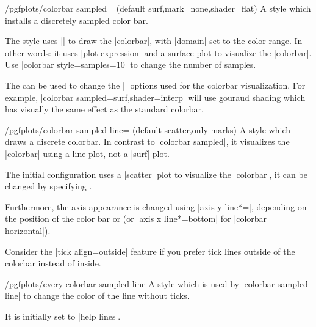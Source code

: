 \begin{stylekey}{/pgfplots/colorbar sampled= (default surf,mark=none,shader=flat)}
	A style which installs a discretely sampled color bar.
\begin{codeexample}[]
\end{codeexample}
	The style uses || to draw the |colorbar|, with |domain| set to the color range. In other words: it uses |plot expression| and a surface plot to visualize the |colorbar|. Use |colorbar style={samples=10}| to change the number of samples.
\begin{codeexample}[]
\end{codeexample}
	The  can be used to change the || options used for the colorbar visualization. For example, |colorbar sampled={surf,shader=interp}| will use gouraud shading which has visually the same effect as the standard colorbar.
\end{stylekey}

\begin{stylekey}{/pgfplots/colorbar sampled line= (default scatter,only marks)}
	A style which draws a discrete colorbar. In contrast to |colorbar sampled|, it visualizes the |colorbar| using a line plot, not a |surf| plot.
\begin{codeexample}[]
\end{codeexample}
	The initial configuration uses a |scatter| plot to visualize the |colorbar|, it can be changed by specifying .

	Furthermore, the axis appearance is changed using |axis y line*=|, depending on the position of the color bar or (or |axis x line*=bottom| for |colorbar horizontal|).

	Consider the |tick align=outside| feature if you prefer tick lines outside of the colorbar instead of inside.

	\begin{stylekey}{/pgfplots/every colorbar sampled line}
		A style which is used by |colorbar sampled line| to change the color of the line without ticks.

		It is initially set to |help lines|.
	\end{stylekey}
\end{stylekey}

